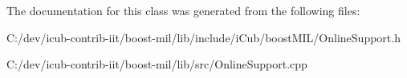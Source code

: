 The documentation for this class was generated from the following files\+:\begin{DoxyCompactItemize}
\item 
C\+:/dev/icub-\/contrib-\/iit/boost-\/mil/lib/include/i\+Cub/boost\+M\+I\+L/Online\+Support.\+h\item 
C\+:/dev/icub-\/contrib-\/iit/boost-\/mil/lib/src/Online\+Support.\+cpp\end{DoxyCompactItemize}
